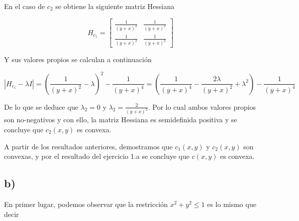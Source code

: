 \documentclass[10pt,a4paper]{report}
\begin{document}
	En el caso de $c_2$ se obtiene la siguiente matriz Hessiana
	
	\[ H_{c_1} = \begin{bmatrix}
		\frac{1}{(y+x)^2} & \frac{1}{(y+x)^2}\\
		\frac{1}{(y+x)^2} & \frac{1}{(y+x)^2}
	\end{bmatrix} \]
	
	Y sus valores propios se calculan a continuación
	
	$$|H_{c_1} - \lambda I| = (\frac{1}{(y+x)^2}-\lambda)^2 - \frac{1}{(y+x)^4} = (\frac{1}{(y+x)^4}-\frac{2\lambda }{(y+x)^2} + \lambda^2 ) - \frac{1}{(y+x)^4}$$
	
	De lo que se deduce que $\lambda_2 = 0$ y $\lambda_2 = \frac{2}{(y+x)^2}$. Por lo cual ambos valores propios son no-negativos y con ello, la matriz Hessiana es semidefinida positiva y se concluye que $c_2(x,y)$ es convexa.
	
	A partir de los resultados anteriores, demostramos que $c_1(x,y)$ y $c_2(x,y)$ son convexas, y por el resultado del ejercicio 1.a se concluye que $c(x,y)$ es convexa.
	
	\subsection*{b) }
	
	En primer lugar, podemos observar que la restricción $x^2 + y^2 \leq 1$ es lo mismo que decir 
	
\end{document}
